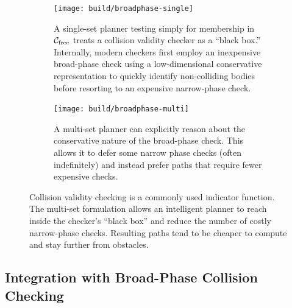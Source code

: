 \documentclass{report}
\begin{document}
\begin{figure}
\centering

\begin{subfigure}[t]{\linewidth}
\centering
\texttt{[image: build/broadphase-single]}
\caption{A single-set planner testing simply for membership in
  $\mathcal{C}_{\mbox{\scriptsize free}}$
  treats a collision validity checker as a
  ``black box.''
  Internally,
  modern checkers first employ an inexpensive broad-phase check
  using a low-dimensional conservative representation
  to quickly identify non-colliding bodies before
  resorting to an expensive narrow-phase check.}
\end{subfigure}

\vspace{0.2in}

\begin{subfigure}[t]{\linewidth}
\centering
\texttt{[image: build/broadphase-multi]}
\caption{A multi-set planner can explicitly reason about the
  conservative nature of the broad-phase check.
  This allows it to defer some narrow phase checks
  (often indefinitely)
  and instead prefer paths that require fewer expensive checks.}
\end{subfigure}

\caption{Collision validity checking is a commonly used
  indicator function.
  The multi-set formulation allows an intelligent planner to
  reach inside the checker's ``black box'' and reduce the number
  of costly narrow-phase checks.
  Resulting paths tend to be cheaper to compute and
  stay further from obstacles.}
\label{fig:broad-phase}
\end{figure}

\subsection{Integration with Broad-Phase Collision Checking}
\label{subsec:broad-phase}
\end{document}
